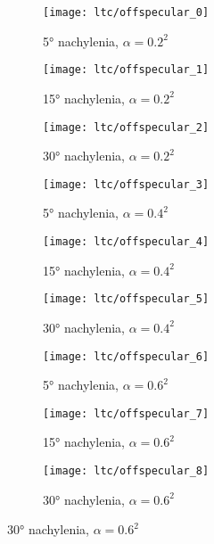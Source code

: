 \documentclass[../main.tex]{subfiles}
\begin{document}
\begin{figure}
    \centering
    
    \begin{subfigure}[t]{0.3\textwidth}
        \texttt{[image: ltc/offspecular\_0]}
        \caption{\ang{5} nachylenia, $\alpha = 0.2^2$}
    \end{subfigure}
    \begin{subfigure}[t]{0.3\textwidth}
        \texttt{[image: ltc/offspecular\_1]}
        \caption{\ang{15} nachylenia, $\alpha = 0.2^2$}
    \end{subfigure}
    \begin{subfigure}[t]{0.3\textwidth}
        \texttt{[image: ltc/offspecular\_2]}
        \caption{\ang{30} nachylenia, $\alpha = 0.2^2$}
    \end{subfigure}

    \begin{subfigure}[t]{0.3\textwidth}
        \centering
        \texttt{[image: ltc/offspecular\_3]}
        \caption{\ang{5} nachylenia, $\alpha = 0.4^2$}
    \end{subfigure}
    \begin{subfigure}[t]{0.3\textwidth}
        \centering
        \texttt{[image: ltc/offspecular\_4]}
        \caption{\ang{15} nachylenia, $\alpha = 0.4^2$}
    \end{subfigure}
    \begin{subfigure}[t]{0.3\textwidth}
        \centering
        \texttt{[image: ltc/offspecular\_5]}
        \caption{\ang{30} nachylenia, $\alpha = 0.4^2$}
    \end{subfigure}

    \begin{subfigure}[t]{0.3\textwidth}
        \centering
        \texttt{[image: ltc/offspecular\_6]}
        \caption{\ang{5} nachylenia, $\alpha = 0.6^2$}
    \end{subfigure}
    \begin{subfigure}[t]{0.3\textwidth}
        \centering
        \texttt{[image: ltc/offspecular\_7]}
        \caption{\ang{15} nachylenia, $\alpha = 0.6^2$}
    \end{subfigure}
    \begin{subfigure}[t]{0.3\textwidth}
        \centering
        \texttt{[image: ltc/offspecular\_8]}
        \caption{\ang{30} nachylenia, $\alpha = 0.6^2$}
    \end{subfigure}


\end{figure}
\end{document}
